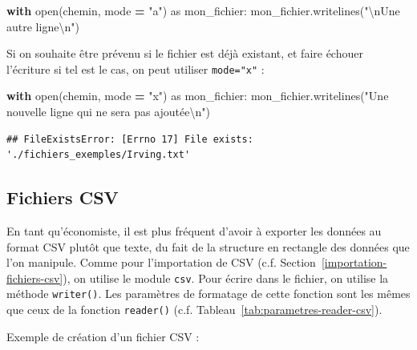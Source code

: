 \documentclass[
  12pt,
]{book}
\newenvironment{Shaded}{\begin{snugshade}}{\end{snugshade}}
\newcommand{\BuiltInTok}[1]{#1}
\newcommand{\CharTok}[1]{\textcolor[rgb]{0.31,0.60,0.02}{#1}}
\newcommand{\ControlFlowTok}[1]{\textcolor[rgb]{0.13,0.29,0.53}{\textbf{#1}}}
\newcommand{\ImportTok}[1]{#1}
\newcommand{\NormalTok}[1]{#1}
\newcommand{\OperatorTok}[1]{\textcolor[rgb]{0.81,0.36,0.00}{\textbf{#1}}}
\newcommand{\StringTok}[1]{\textcolor[rgb]{0.31,0.60,0.02}{#1}}
\numberwithin{equation}{section}
\numberwithin{countremarque}{section}
\begin{document}
\begin{Shaded}
\begin{Highlighting}[]
\ControlFlowTok{with} \BuiltInTok{open}\NormalTok{(chemin, mode }\OperatorTok{=} \StringTok{"a"}\NormalTok{) }\ImportTok{as}\NormalTok{ mon\_fichier:}
\NormalTok{  mon\_fichier.writelines(}\StringTok{"}\CharTok{\textbackslash{}n}\StringTok{Une autre ligne}\CharTok{\textbackslash{}n}\StringTok{"}\NormalTok{)}
\end{Highlighting}
\end{Shaded}

Si on souhaite être prévenu si le fichier est déjà existant, et faire échouer l'écriture si tel est le cas, on peut utiliser \texttt{mode="x"} :

\begin{Shaded}
\begin{Highlighting}[]
\ControlFlowTok{with} \BuiltInTok{open}\NormalTok{(chemin, mode }\OperatorTok{=} \StringTok{"x"}\NormalTok{) }\ImportTok{as}\NormalTok{ mon\_fichier:}
\NormalTok{  mon\_fichier.writelines(}\StringTok{"Une nouvelle ligne qui ne sera pas ajoutée}\CharTok{\textbackslash{}n}\StringTok{"}\NormalTok{)}
\end{Highlighting}
\end{Shaded}

\begin{lstlisting}
## FileExistsError: [Errno 17] File exists: './fichiers_exemples/Irving.txt'
\end{lstlisting}

\subsection{Fichiers CSV}\label{fichiers-csv}

En tant qu'économiste, il est plus fréquent d'avoir à exporter les données au format CSV plutôt que texte, du fait de la structure en rectangle des données que l'on manipule. Comme pour l'importation de CSV (c.f. Section~\ref{importation-fichiers-csv}), on utilise le module \texttt{csv}. Pour écrire dans le fichier, on utilise la méthode \texttt{writer()}. Les paramètres de formatage de cette fonction sont les mêmes que ceux de la fonction \texttt{reader()} (c.f. Tableau~\ref{tab:parametres-reader-csv}).

Exemple de création d'un fichier CSV :
\end{document}
